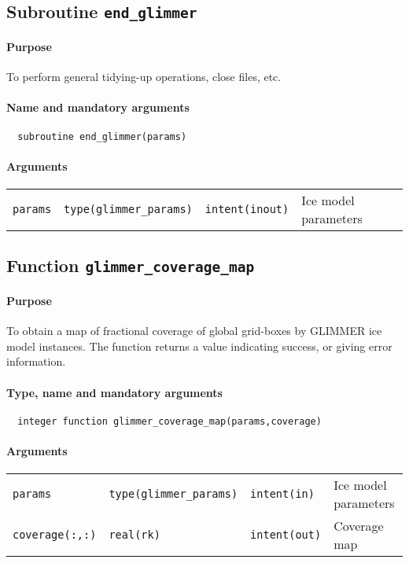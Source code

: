\subsection{Subroutine \texttt{end\_glimmer}}
%
\paragraph{Purpose} To perform general tidying-up operations, close files, etc.
%
\paragraph{Name and mandatory arguments}
%
\begin{verbatim}
  subroutine end_glimmer(params)
\end{verbatim}
%
\paragraph{Arguments}
%
\begin{center}
\begin{tabular}{llll}
\texttt{params} & \texttt{type(glimmer\_params)} & \texttt{intent(inout)} & Ice model
parameters \\
\end{tabular}
\end{center}
%
\subsection{Function \texttt{glimmer\_coverage\_map}}
%
\paragraph{Purpose} To obtain a map of fractional coverage of global
grid-boxes by GLIMMER ice model instances. The function returns a value
indicating success, or giving error information.
%
\paragraph{Type, name and mandatory arguments}
%
\begin{verbatim}
  integer function glimmer_coverage_map(params,coverage)
\end{verbatim}
%
\paragraph{Arguments}
%
\begin{center}
\begin{tabular}{llll}
\texttt{params} & \texttt{type(glimmer\_params)} & \texttt{intent(in)} & Ice model parameters \\
\texttt{coverage(:,:)} & \texttt{real(rk)} & \texttt{intent(out)} & Coverage
map \\
\end{tabular}
\end{center}
%
